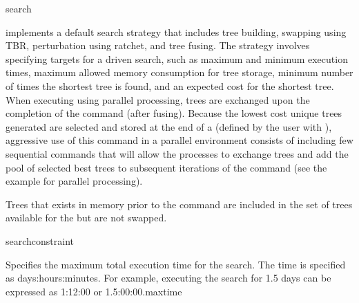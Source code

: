    
\begin{command}{search}{}


	\begin{poydescription}
             implements a default search strategy that
            includes tree building, swapping using TBR, perturbation using
            ratchet, and tree fusing. The strategy involves specifying targets for 
            a driven search, such as maximum and minimum execution times, 
            maximum allowed memory consumption for tree storage, minimum number of times the
            shortest tree is found, and an expected cost for the shortest tree.  When executing
              using parallel processing, trees are exchanged upon the
              completion of the command (after fusing).  Because the lowest cost unique trees 
              generated are selected and stored at the end of a  
              (defined by the user with ), aggressive use of this 
              command in a parallel environment consists of including few sequential
                commands that will allow the processes to
               exchange trees and add the pool of selected
               best trees to subsequent iterations of the command (see the example for parallel processing).

               Trees that exists in memory prior to the  command
               are included in the set of trees available for the
                but are not swapped.
	\end{poydescription}

	\begin{arguments}

        {searchconstraint}

        	      
        
        {Specifies the maximum total execution time for the search. The time is specified as
        days:hours:minutes. For example, executing the search for 1.5 days can
        be expressed as 1:12:00 or 1.5:00:00.}{maxtime}
        

\end{arguments}
\end{command}
